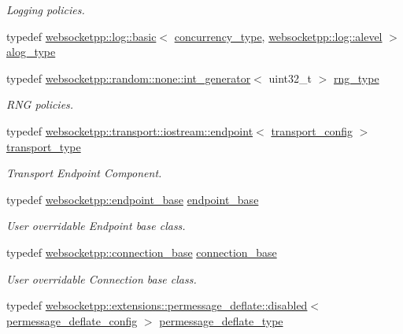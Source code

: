 \begin{DoxyCompactItemize}
\begin{DoxyCompactList}\small\item\em Logging policies. \end{DoxyCompactList}\item 
typedef \hyperlink{classwebsocketpp_1_1log_1_1basic}{websocketpp\+::log\+::basic}$<$ \hyperlink{structwebsocketpp_1_1config_1_1debug__core_aada73b9183fc032c25178870dbb4d83d}{concurrency\+\_\+type}, \hyperlink{structwebsocketpp_1_1log_1_1alevel}{websocketpp\+::log\+::alevel} $>$ \hyperlink{structwebsocketpp_1_1config_1_1debug__core_a2e57e38001385110ce0fbbd17af6b0af}{alog\+\_\+type}
\item 
typedef \hyperlink{classwebsocketpp_1_1random_1_1none_1_1int__generator}{websocketpp\+::random\+::none\+::int\+\_\+generator}$<$ uint32\+\_\+t $>$ \hyperlink{structwebsocketpp_1_1config_1_1debug__core_ae59c72992beaef76957c8bfe407394e8}{rng\+\_\+type}
\begin{DoxyCompactList}\small\item\em R\+N\+G policies. \end{DoxyCompactList}\item 
typedef \hyperlink{classwebsocketpp_1_1transport_1_1iostream_1_1endpoint}{websocketpp\+::transport\+::iostream\+::endpoint}$<$ \hyperlink{structwebsocketpp_1_1config_1_1debug__core_1_1transport__config}{transport\+\_\+config} $>$ \hyperlink{structwebsocketpp_1_1config_1_1debug__core_ac4daf5769128b2154a4b1f66e60e0e43}{transport\+\_\+type}
\begin{DoxyCompactList}\small\item\em Transport Endpoint Component. \end{DoxyCompactList}\item 
typedef \hyperlink{classwebsocketpp_1_1endpoint__base}{websocketpp\+::endpoint\+\_\+base} \hyperlink{structwebsocketpp_1_1config_1_1debug__core_aeecf0530d869006ceab3aa4f5ee74663}{endpoint\+\_\+base}
\begin{DoxyCompactList}\small\item\em User overridable Endpoint base class. \end{DoxyCompactList}\item 
typedef \hyperlink{classwebsocketpp_1_1connection__base}{websocketpp\+::connection\+\_\+base} \hyperlink{structwebsocketpp_1_1config_1_1debug__core_a5ff6c6c670417fd86609c8d7a412815d}{connection\+\_\+base}
\begin{DoxyCompactList}\small\item\em User overridable Connection base class. \end{DoxyCompactList}\item 
typedef \hyperlink{classwebsocketpp_1_1extensions_1_1permessage__deflate_1_1disabled}{websocketpp\+::extensions\+::permessage\+\_\+deflate\+::disabled}$<$ \hyperlink{structwebsocketpp_1_1config_1_1debug__core_1_1permessage__deflate__config}{permessage\+\_\+deflate\+\_\+config} $>$ \hyperlink{structwebsocketpp_1_1config_1_1debug__core_a7fc8d2b3ac3f07c03b7e912524a944df}{permessage\+\_\+deflate\+\_\+type}
\end{DoxyCompactItemize}
